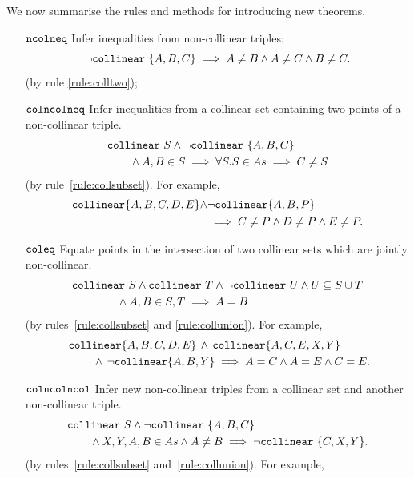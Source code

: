 We now summarise the rules and methods for introducing new theorems. 
\begin{itemize}\label{list:Procedures}
\item[$\texttt{ncolneq}$] Infer inequalities from non-collinear triples:
\begin{displaymath}
\neg\texttt{collinear}\ \{A,B,C\} \implies A \neq B \wedge A \neq C \wedge B \neq C.
\end{displaymath} (by rule \ref{rule:colltwo});
\item[$\texttt{colncolneq}$] Infer inequalities from a collinear set containing two points of a non-collinear triple. 
\begin{align*}
  &\texttt{collinear}\ S \wedge \neg\texttt{collinear}\ \{A,B,C\}\\
  &\qquad\wedge A,B\in S \implies \forall S. S \in As \implies C \neq S
\end{align*}(by rule~\ref{rule:collsubset}). For example, 
\begin{align*}
\texttt{collinear} \{A, B, C, D, E\} \wedge & \neg\texttt{collinear} \{A, B, P\}\\
&\implies C \neq P \wedge D \neq P \wedge E \neq P.
\end{align*}
\item[$\texttt{coleq}$]
Equate points in the intersection of two collinear sets which are jointly non-collinear.
\begin{align*}
&\texttt{collinear}\ S \wedge \texttt{collinear}\ T \wedge \neg\texttt{collinear}\ U \wedge U \subseteq S \cup T \\
&\qquad\qquad\wedge A,B \in S,T \implies A = B
\end{align*} (by rules~\ref{rule:collsubset} and \ref{rule:collunion}).
For example,
\begin{align*}\
&\texttt{collinear} \{A, B, C, D, E\} \,\wedge\,\texttt{collinear} \{A, C, E, X, Y\}\\ 
&\qquad\, \wedge\,\neg\texttt{collinear} \{A, B, Y\}\implies A = C \wedge A = E \wedge C = E.
\end{align*}
\item[$\texttt{colncolncol}$] Infer new non-collinear triples from a collinear set and another non-collinear triple.
\begin{align*}
  &\texttt{collinear}\ S \wedge \neg\texttt{collinear}\ \{A,B,C\}\\
  &\qquad\wedge X,Y,A,B \in As \wedge A \neq B\implies \neg\texttt{collinear}\ \{C,X,Y\}.
\end{align*} (by rules~\ref{rule:collsubset} and~\ref{rule:collunion}). For example,

\end{itemize}
